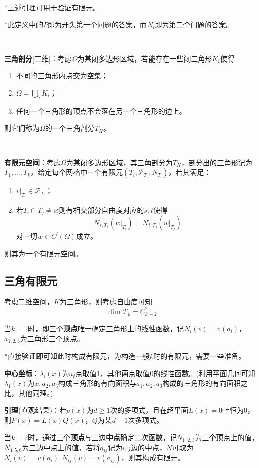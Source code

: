 \documentclass[a4paper,UTF8,fontset=windows]{ctexart}
\newcommand*{\cp}{\mathcal{P}}
\begin{document}
*上述引理可用于验证有限元。

*此定义中的$P$即为开头第一个问题的答案，而$N_i$即为第二个问题的答案。

\

\textbf{三角剖分}[二维]：考虑$\Omega$为某闭多边形区域，若能存在一些闭三角形$K_i$使得
\begin{enumerate}
    \item 不同的三角形内点交为空集；
    \item $\Omega=\bigcup_iK_i$；
    \item 任何一个三角形的顶点不会落在另一个三角形的边上。
\end{enumerate}
则它们称为$\Omega$的一个三角剖分$T_K$。

\

\textbf{有限元空间}：考虑$\Omega$为某闭多边形区域，其三角剖分为$T_K$，剖分出的三角形记为$T_1,\dots,T_k$，给定每个网格中一个有限元$(T_i,\cp_{T_i},N_{T_i})$，若其满足：
\begin{enumerate}
    \item $v\big|_{T_i}\in \cp_{T_i}$；
    \item 若$T_i\cap T_j\ne\varnothing$则有相交部分自由度对应的$s,t$使得
    $$N_{s,T_i}(w\big|_{T_i})=N_{t,T_j}(w\big|_{T_j})$$
    对一切$w\in C^l(\Omega)$成立。
\end{enumerate}
则其为一个有限元空间。

\subsection{三角有限元}
考虑二维空间，$K$为三角形，则考虑自由度可知
$$\dim \cp_k=C_{k+2}^2$$

当$k=1$时，即三个\textbf{顶点}唯一确定三角形上的线性函数，记$N_i(v)=v(a_i)$，$a_{1,2,3}$为三角形三个顶点。

*直接验证即可知此时构成有限元，为构造一般$k$时的有限元，需要一些准备。

\textbf{中心坐标}：$\lambda_i(x)$为$a_i$点取值1，其他两点取值0的线性函数。(利用平面几何可知$\lambda_1(x)$为$x,a_2,a_3$构成三角形的有向面积与$a_1,a_2,a_3$构成的三角形的有向面积之比，其他同理。)

\textbf{引理}(直观结果)：若$p(x)$为$d\ge1$次的多项式，且在超平面$L(x)=0$上恒为0，则$P(x)=L(x)Q(x)$，$Q$为某$d-1$次多项式。

当$k=2$时，通过三个\textbf{顶点}与三边\textbf{中点}确定二次函数，记$N_{1,2,3}$为三个顶点上的值，$N_{4,5,6}$为三边中点上的值，若将$a_{ij}$记为$i,j$边的中点，$N$可取为$N_i(v)=v(a_i),N_{ij}(v)=v(a_{ij})$，则其构成有限元。
\end{document}
